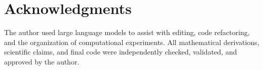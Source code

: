 \documentclass[letterpaper,10pt,conference]{IEEEtran}
\begin{document}
	\section{Acknowledgments}
	The author used large language models to assist with editing, code
	refactoring, and the organization of computational experiments. All mathematical derivations, scientific claims, and final code were independently checked, validated, and approved by the author.
	
	
	
	
\end{document}
